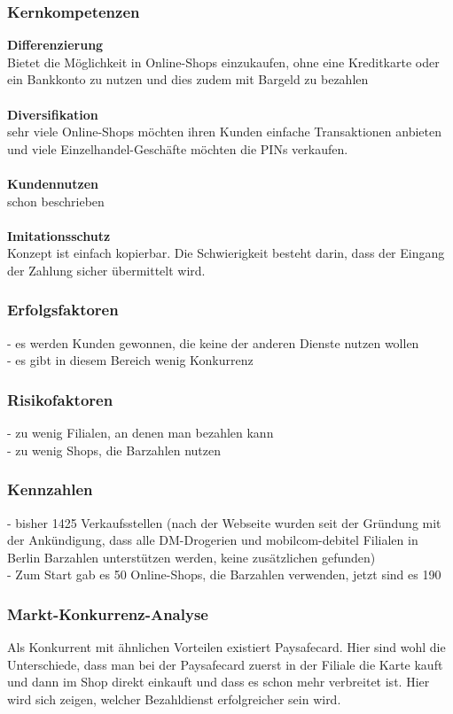 \subsubsection{Kernkompetenzen}
\textbf{Differenzierung}\\
Bietet die Möglichkeit in Online-Shops einzukaufen, ohne eine Kreditkarte oder ein Bankkonto zu nutzen und dies zudem
mit Bargeld zu bezahlen\\
\\
\textbf{Diversifikation}\\
sehr viele Online-Shops möchten ihren Kunden einfache Transaktionen anbieten und viele Einzelhandel-Geschäfte möchten
die PINs verkaufen.\\
\\
\textbf{Kundennutzen}\\
schon beschrieben\\
\\
\textbf{Imitationsschutz}\\
Konzept ist einfach kopierbar. Die Schwierigkeit besteht darin, dass der Eingang der Zahlung sicher übermittelt wird.\\

\subsubsection{Erfolgsfaktoren}
- es werden Kunden gewonnen, die keine der anderen Dienste nutzen wollen\\
- es gibt in diesem Bereich wenig Konkurrenz\\

\subsubsection{Risikofaktoren}
- zu wenig Filialen, an denen man bezahlen kann\\
- zu wenig Shops, die Barzahlen nutzen\\

\subsubsection{Kennzahlen}
- bisher 1425 Verkaufsstellen (nach der Webseite wurden seit der Gründung mit der Ankündigung, dass alle DM-Drogerien
und mobilcom-debitel Filialen in Berlin Barzahlen unterstützen werden, keine zusätzlichen gefunden) \\
- Zum Start gab es 50 Online-Shops, die Barzahlen verwenden, jetzt sind es 190\\

\subsubsection{Markt-Konkurrenz-Analyse}
Als Konkurrent mit ähnlichen Vorteilen existiert Paysafecard. Hier sind wohl die Unterschiede, dass man bei der
Paysafecard zuerst in der Filiale die Karte kauft und dann im Shop direkt einkauft und dass es schon mehr verbreitet ist.
Hier wird sich zeigen, welcher Bezahldienst erfolgreicher sein wird.
